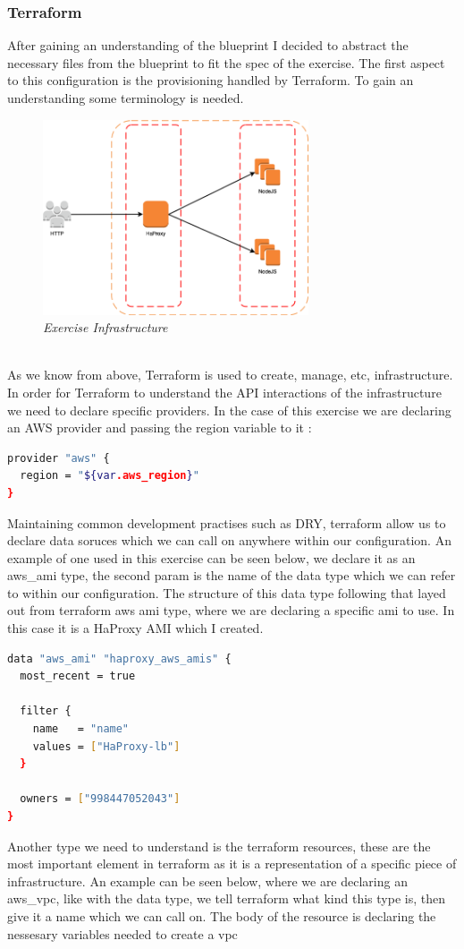 \subsubsection{Terraform}
After gaining an understanding of the blueprint I decided to abstract the necessary files from the blueprint to fit the spec of the exercise. The first aspect to this configuration is the provisioning handled by Terraform. To gain an understanding some terminology is needed.
\begin{figure}[!ht]
\centering
\includegraphics*[width=0.7\textwidth]{images/haproxy.png}
\caption{\em Exercise Infrastructure}
\label{img:p2}
\end{figure}
\\As we know from above, Terraform is used to create, manage, etc, infrastructure. In order for Terraform to understand the API interactions of the infrastructure we need to declare specific providers. In the case of this exercise we are declaring an AWS provider and passing the region variable to it :
\begin{lstlisting}[language=bash]
provider "aws" {
  region = "${var.aws_region}"
}
\end{lstlisting}
Maintaining common development practises such as DRY, terraform allow us to declare data soruces which we can call on anywhere within our configuration. An example of one used in this exercise can be seen below, we declare it as an aws\_ami type, the second param is the name of the data type which we can refer to within our configuration. The structure of this data type following that layed out from terraform aws ami type, where we are declaring a specific ami to use. In this case it is a HaProxy AMI which I created.
\begin{lstlisting}[language=bash]
data "aws_ami" "haproxy_aws_amis" {
  most_recent = true

  filter {
    name   = "name"
    values = ["HaProxy-lb"]
  }

  owners = ["998447052043"]
}
\end{lstlisting}
Another type we need to understand is the terraform resources, these are the most important element in terraform as it is a representation of a specific piece of infrastructure. An example can be seen below, where we are declaring an aws\_vpc, like with the data type, we tell terraform what kind this type is, then give it a name which we can call on. The body of the resource is declaring the nessesary variables needed to create a vpc


